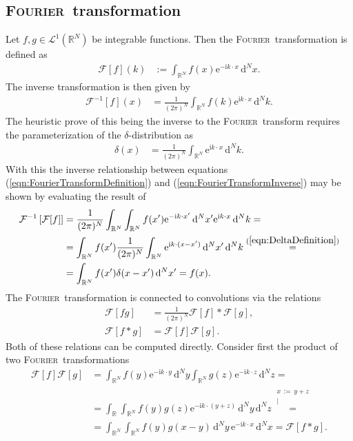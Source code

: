 \documentclass[german, parskip=full]{scrartcl}
\newcommand{\kom}{}
\newcommand{\intr}{}
\newcommand{\klam}{}
\newcommand{\I}{\text{i}}
\newcommand{\e}{\text{e}}
\newcommand*{\Fourier}{\textsc{Fourier}\ }
\newcommand*{\F}{\mathcal{F}}
\begin{document}
\subsection{\Fourier transformation}
Let $f,g\in\mathcal{L}^1(\mathbb{R}^N)$ be integrable functions.
Then the \Fourier transformation is defined as
\begin{align}
\F[f](k)&:=\intr\int_{\mathbb{R}^{N}}{f(x)\e^{-\I k\cdot x}}\,\mathrm{d}^{N}x. \label{eqn:FourierTransformDefinition}
\end{align}
The inverse transformation is then given by
\begin{align}
\F^{-1}[f](x)&=\frac{1}{(2\pi)^N}\intr\int_{\mathbb{R}^{N}}{f(k)\e^{\I k\cdot x}}\,\mathrm{d}^{N}k. \label{eqn:FourierTransformInverse}
\end{align}
The heuristic prove of this being the inverse to the \Fourier transform requires the parameterization of the $\delta$-distribution as
\begin{align}
\delta (x)&=\frac{1}{(2\pi)^N}\intr\int_{\mathbb{R}^{N}}{\e^{\I k\cdot x}}\,\mathrm{d}^{N}k. \label{eqn:DeltaDefinition}
\end{align}
With this the inverse relationship between equations (\ref{eqn:FourierTransformDefinition}) and (\ref{eqn:FourierTransformInverse}) may be shown by evaluating the result of
\begin{align*}
\F^{-1}\klam\left[ {\F[f]} \right]&=\frac{1}{(2\pi)^N}\intr\int_{\mathbb{R}^{N}}{\intr\int_{\mathbb{R}^{N}}{f(x')\e^{-\I k\cdot x'}}\,\mathrm{d}^{N}x'}\e^{\I k\cdot x}\,\mathrm{d}^{N}k=\\
&=\intr\int_{\mathbb{R}^{N}}{f(x')\frac{1}{(2\pi)^N}\intr\int_{\mathbb{R}^{N}}{\e^{\I k\cdot (x-x')}}\,\mathrm{d}^{N}x'}\,\mathrm{d}^{N}k\overset{(\ref{eqn:DeltaDefinition})}{=}\\
&=\intr\int_{\mathbb{R}^{N}}{f(x')\delta (x-x')}\,\mathrm{d}^{N}x'=f(x).
\end{align*}
The \Fourier transformation is connected to convolutions via the relations
\begin{align}
\F[fg]&=\frac{1}{(2\pi)^N}\F[f]\ast\F[g],  \label{eqn:FourierTransformProduct}\\
\F[f\ast g]&=\F[f]\F[g]. \label{eqn:FourierTransformConvolution}
\end{align}
Both of these relations can be computed directly.
Consider first the product of two \Fourier transformations 
\begin{align*}
\F[f]\F[g]&=\intr\int_{\mathbb{R}^{N}}{f(y)\e^{-\I k\cdot y}}\,\mathrm{d}^{N}y \intr\int_{\mathbb{R}^{N}}{g(z)\e^{-\I k\cdot z}}\,\mathrm{d}^{N}z=\\
&=\intr\int_{\mathbb{R}^{ }}{\intr\int_{\mathbb{R}^{N }}{f(y)g(z)\e^{-\I k\cdot (y+z)}}\,\mathrm{d}^{N}y}\,\mathrm{d}^{N}z\kom\overset{\substack{{x\,:=\, y+z} \\ |}}{=}\\
&=\intr\int_{\mathbb{R}^{N}}{\intr\int_{\mathbb{R}^{N}}{f(y)g(x-y)}\,\mathrm{d}^{N}y}\,\e^{-\I k\cdot x}\,\mathrm{d}^{N}x=\F[f\ast g].
\end{align*}
\end{document}
